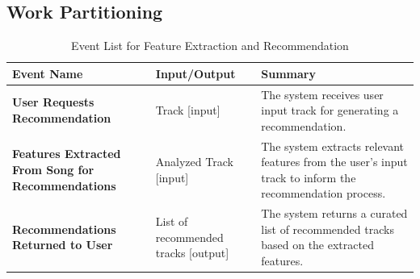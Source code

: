 \documentclass[12pt]{article}
\begin{document}
\subsection{Work Partitioning}
\begin{table}[H]
  \centering
  \caption{Event List for Feature Extraction and Recommendation}
  \label{tab:event-list}
  \begin{tabular}{|p{5cm}|p{4cm}|p{7cm}|}
    \hline
    \textbf{Event Name} & \textbf{Input/Output} & \textbf{Summary} \\
    \hline
    \textbf{User Requests Recommendation} 
    & Track [input] 
    & The system receives user input track for generating a recommendation. \\
    \hline
    \textbf{Features Extracted From Song for Recommendations} 
    & Analyzed Track [input] 
    & The system extracts relevant features from the user’s input track to inform the recommendation process. \\
    \hline
    \textbf{Recommendations Returned to User} 
    & List of recommended tracks [output] 
    & The system returns a curated list of recommended tracks based on the extracted features. \\
    \hline
  \end{tabular}
\end{table}

\end{document}
